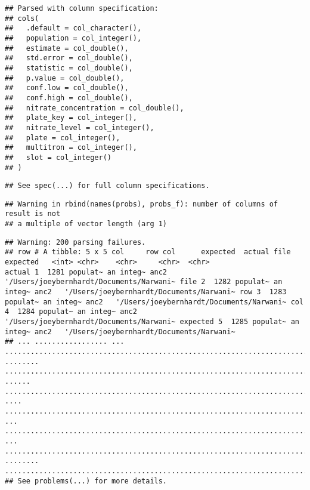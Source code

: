 \documentclass[]{article}
\begin{document}
\begin{verbatim}
## Parsed with column specification:
## cols(
##   .default = col_character(),
##   population = col_integer(),
##   estimate = col_double(),
##   std.error = col_double(),
##   statistic = col_double(),
##   p.value = col_double(),
##   conf.low = col_double(),
##   conf.high = col_double(),
##   nitrate_concentration = col_double(),
##   plate_key = col_integer(),
##   nitrate_level = col_integer(),
##   plate = col_integer(),
##   multitron = col_integer(),
##   slot = col_integer()
## )
\end{verbatim}

\begin{verbatim}
## See spec(...) for full column specifications.
\end{verbatim}

\begin{verbatim}
## Warning in rbind(names(probs), probs_f): number of columns of result is not
## a multiple of vector length (arg 1)
\end{verbatim}

\begin{verbatim}
## Warning: 200 parsing failures.
## row # A tibble: 5 x 5 col     row col      expected  actual file                                     expected   <int> <chr>    <chr>     <chr>  <chr>                                    actual 1  1281 populat~ an integ~ anc2   '/Users/joeybernhardt/Documents/Narwani~ file 2  1282 populat~ an integ~ anc2   '/Users/joeybernhardt/Documents/Narwani~ row 3  1283 populat~ an integ~ anc2   '/Users/joeybernhardt/Documents/Narwani~ col 4  1284 populat~ an integ~ anc2   '/Users/joeybernhardt/Documents/Narwani~ expected 5  1285 populat~ an integ~ anc2   '/Users/joeybernhardt/Documents/Narwani~
## ... ................. ... .......................................................................... ........ .......................................................................... ...... .......................................................................... .... .......................................................................... ... .......................................................................... ... .......................................................................... ........ ..........................................................................
## See problems(...) for more details.
\end{verbatim}
\end{document}
